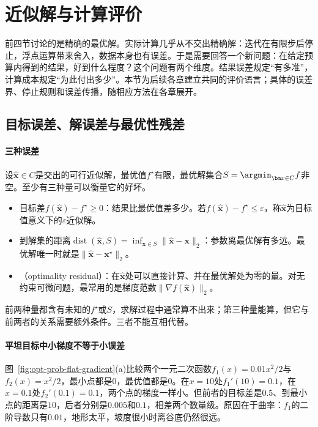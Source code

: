 \section{近似解与计算评价}
\label{sec:opt-prob-approximation}

前四节讨论的是精确的最优解。实际计算几乎从不交出精确解：迭代在有限步后停止，浮点运算带来舍入，数据本身也有误差。于是需要回答一个新问题：在给定预算内得到的结果，好到什么程度？这个问题有两个维度。结果误差规定“有多准”，计算成本规定“为此付出多少”。本节为后续各章建立共同的评价语言；具体的误差界、停止规则和误差传播，随相应方法在各章展开。

\subsection{目标误差、解误差与最优性残差}
\label{sec:opt-prob-error-measures}

\paragraph{三种误差}
设$\hat{\bm x}\in C$是交出的可行近似解，最优值$f^\star$有限，最优解集合$S=\argmin_{\bm x\in C}f$非空。至少有三种量可以衡量它的好坏。

\begin{itemize}
  \item 目标差$f(\hat{\bm x})-f^\star\geq0$：结果比最优值差多少。若$f(\hat{\bm x})-f^\star\leq\varepsilon$，称$\hat{\bm x}$为目标值意义下的$\varepsilon$近似解。
  \item 到解集的距离$\operatorname{dist}(\hat{\bm x},S)=\inf_{\bm x\in S}\lVert\hat{\bm x}-\bm x\rVert_2$：参数离最优解有多远。最优解唯一时就是$\lVert\hat{\bm x}-\bm x^\star\rVert_2$。
  \item {}（optimality residual）：在$\hat{\bm x}$处可以直接计算、并在最优解处为零的量。对无约束可微问题，最常用的是梯度范数$\lVert\nabla f(\hat{\bm x})\rVert_2$。
\end{itemize}

前两种量都含有未知的$f^\star$或$S$，求解过程中通常算不出来；第三种量能算，但它与前两者的关系需要额外条件。三者不能互相代替。

\paragraph{平坦目标中小梯度不等于小误差}
图~\ref{fig:opt-prob-flat-gradient}(a)比较两个一元二次函数$f_1(x)=0.01x^2/2$与$f_2(x)=x^2/2$，最小点都是$0$，最优值都是$0$。在$x=10$处$f_1'(10)=0.1$，在$x=0.1$处$f_2'(0.1)=0.1$，两个点的梯度一样小。但前者的目标差是$0.5$、到最小点的距离是$10$，后者分别是$0.005$和$0.1$，相差两个数量级。原因在于曲率：$f_1$的二阶导数只有$0.01$，地形太平，坡度很小时离谷底仍然很远。

